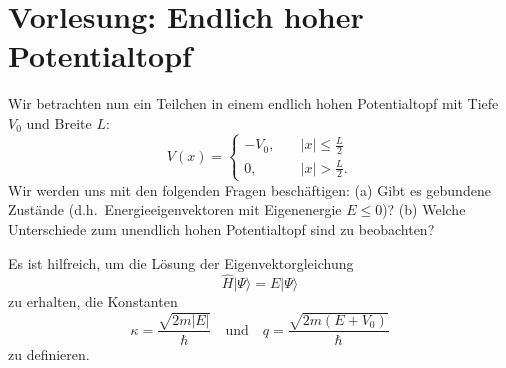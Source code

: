 
\section{Vorlesung: Endlich hoher Potentialtopf}
Wir betrachten nun ein Teilchen in einem endlich hohen Potentialtopf mit Tiefe $V_0$ und Breite $L$:
\begin{equation}
	V(x) = \begin{cases}
		-V_0, \quad &|x|\le \frac{L}{2}\\
		0, \quad &|x| > \frac{L}{2}.
	\end{cases}
\end{equation}
Wir werden uns mit den folgenden Fragen beschäftigen: (a) Gibt es gebundene Zustände (d.h.\ Energieeigenvektoren mit Eigenenergie $E\le 0$)? (b) Welche Unterschiede zum unendlich hohen Potentialtopf sind zu beobachten?

Es ist hilfreich, um die Lösung der Eigenvektorgleichung  
\begin{equation}
	\widehat{H}|\Psi\rangle = E|\Psi\rangle
\end{equation}
zu erhalten, die Konstanten
\begin{equation}
	\kappa = \frac{\sqrt{2m|E|}}{\hbar}\quad \text{und}\quad q = \frac{\sqrt{2m(E+V_0)}}{\hbar}
\end{equation}
zu definieren. 


